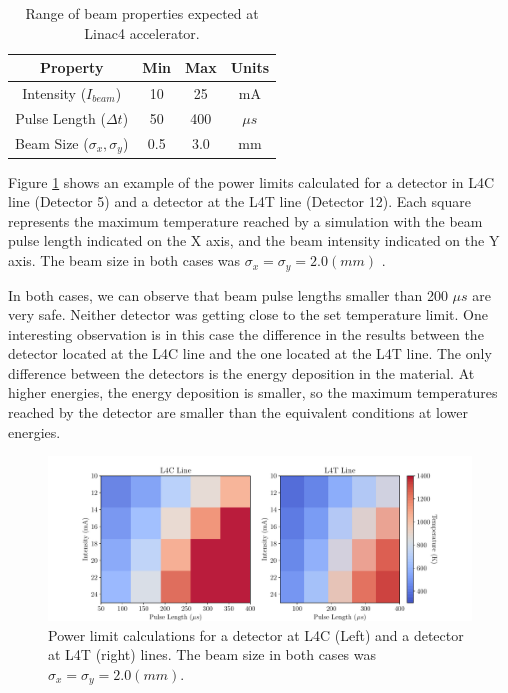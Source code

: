 \begin{table}[h]
    \centering
    \begin{tabular}{cccc}
    \hline
    Property                          & Min & Max & Units   \\ \hline
    Intensity ($I_{beam}$)            & 10  & 25  & mA      \\
    Pulse Length ($\Delta t$)         & 50  & 400 & $\mu s$ \\
    Beam Size ($\sigma_x , \sigma_y$) & 0.5 & 3.0 & mm      \\ \hline
    \end{tabular}
    \caption{Range of beam properties expected at Linac4 accelerator.}
    \label{tab:beamprop}
\end{table}

Figure \ref{fig:EnerCompa} shows an example of the power limits calculated for a detector in L4C line (Detector 5) and a detector at the L4T line (Detector 12). Each square represents the maximum temperature reached by a simulation with the beam pulse length indicated on the X axis, and the beam intensity indicated on the Y axis. The beam size in both cases was $\sigma_x = \sigma_y = 2.0 (mm)$ . 

In both cases, we can observe that beam pulse lengths smaller than 200 $\mu s$ are very safe. Neither detector was getting close to the set temperature limit. One interesting observation is in this case the difference in the results between the detector located at the L4C line and the one located at the L4T line. The only difference between the detectors is the energy deposition in the material. At higher energies, the energy deposition is smaller, so the maximum temperatures reached by the detector are smaller than the equivalent conditions at lower energies. 

\begin{figure}[h]
    \centering
    \includegraphics[width=1.0\columnwidth]{Figure_ThermalLimitsSquares/EnergyCompa.pdf}
    \caption{Power limit calculations for a detector at L4C (Left) and a detector at L4T (right) lines. The beam size in both cases was $\sigma_x = \sigma_y = 2.0 (mm)$.}
    \label{fig:EnerCompa}
\end{figure}

